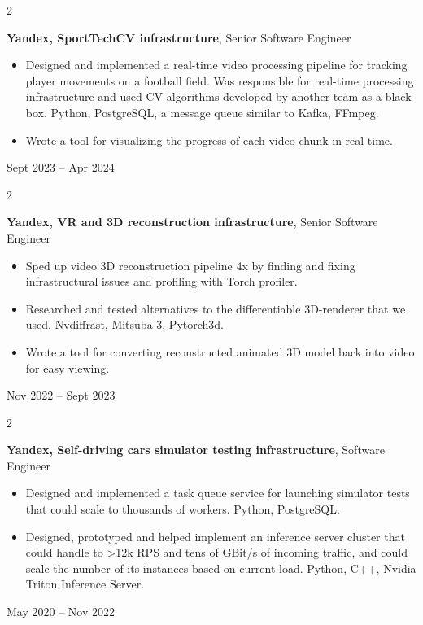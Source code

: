 \documentclass[11pt, letterpaper]{article}
\newenvironment{highlights}{
    \begin{itemize}[
        topsep=0.10 cm,
        parsep=0.10 cm,
        partopsep=0pt,
        itemsep=0pt,
        leftmargin=0.4 cm + 10pt
    ]
}{
    \end{itemize}
} %
\newenvironment{twocolentry}[2][]{
    \onecolentry
    \def\secondColumn{#2}
    \setcolumnwidth{\fill, 4.5 cm}
    \begin{paracol}{2}
}{
    \switchcolumn \raggedleft \secondColumn
    \end{paracol}
    \endonecolentry
} %
\begin{document}
        \begin{twocolentry}{
            Sept 2023 – Apr 2024
        }
            \textbf{Yandex, SportTechCV infrastructure}, Senior Software Engineer
            \begin{highlights}
                \item Designed and implemented a real-time video processing pipeline for tracking player movements on a football field. Was responsible for real-time processing infrastructure and used CV algorithms developed by another team as a black box. Python, PostgreSQL, a message queue similar to Kafka, FFmpeg.
                \item Wrote a tool for visualizing the progress of each video chunk in real-time.
            \end{highlights}
        \end{twocolentry}


        \vspace{0.2 cm}

        \begin{twocolentry}{
            Nov 2022 – Sept 2023
        }
            \textbf{Yandex, VR and 3D reconstruction infrastructure}, Senior Software Engineer
            \begin{highlights}
                \item Sped up video 3D reconstruction pipeline 4x by finding and fixing infrastructural issues and profiling with Torch profiler.
                \item Researched and tested alternatives to the differentiable 3D-renderer that we used. Nvdiffrast, Mitsuba 3, Pytorch3d.
                \item Wrote a tool for converting reconstructed animated 3D model back into video for easy viewing.
            \end{highlights}
        \end{twocolentry}


        \vspace{0.2 cm}

        \begin{twocolentry}{
            May 2020 – Nov 2022
        }
            \textbf{Yandex, Self-driving cars simulator testing infrastructure}, Software Engineer
            \begin{highlights}
                \item Designed and implemented a task queue service for launching simulator tests that could scale to thousands of workers. Python, PostgreSQL.
                \item Designed, prototyped and helped implement an inference server cluster that could handle to >12k RPS and tens of GBit/s of incoming traffic, and could scale the number of its instances based on current load. Python, C++, Nvidia Triton Inference Server.
            \end{highlights}
        \end{twocolentry}
\end{document}
